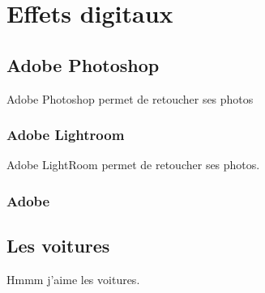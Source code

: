 \documentclass{article}
\begin{document}
\section{Effets digitaux}
\subsection{Adobe Photoshop}
Adobe Photoshop permet de retoucher ses photos

\subsubsection{Adobe Lightroom}
Adobe LightRoom permet de retoucher ses photos.
\subsubsection{Adobe}

\subsection{Les voitures}
Hmmm j'aime les voitures.
\end{document}
